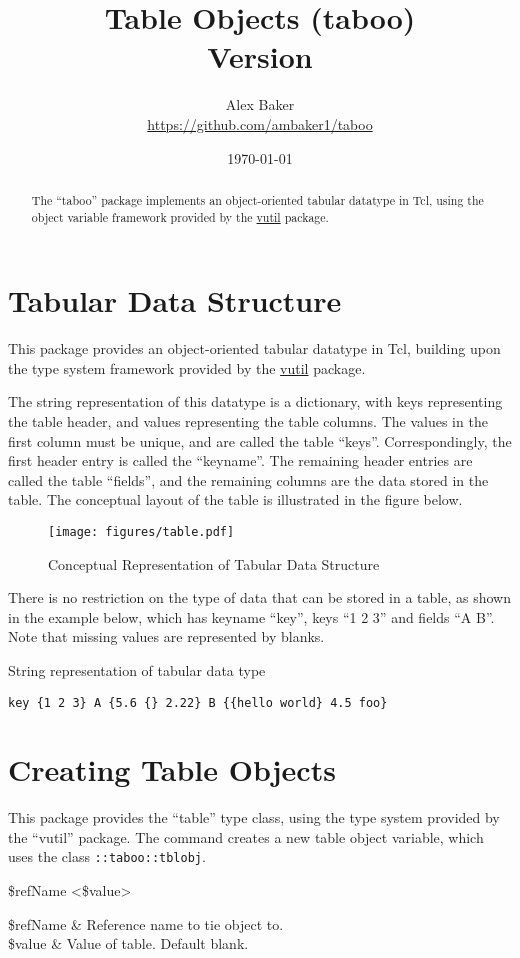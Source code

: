 \documentclass{article}
\title{\Huge{Table Objects (taboo)}\\\large Version \version}
\author{Alex Baker\\\small\url{https://github.com/ambaker1/taboo}}
\date{\small\today}
\begin{document}
\maketitle
\begin{abstract}
\begin{center}
The ``taboo'' package implements an object-oriented tabular datatype in Tcl, using the object variable framework provided by the \textcolor{blue}{\href{https://github.com/ambaker1/vutil}{vutil}} package.
\end{center}
\end{abstract}
\clearpage


\section{Tabular Data Structure}
This package provides an object-oriented tabular datatype in Tcl, building upon the type system framework provided by the \textcolor{blue}{\href{https://github.com/ambaker1/vutil}{vutil}} package.

The string representation of this datatype is a dictionary, with keys representing the table header, and values representing the table columns.
The values in the first column must be unique, and are called the table ``keys''. 
Correspondingly, the first header entry is called the ``keyname''. 
The remaining header entries are called the table ``fields'', and the remaining columns are the data stored in the table.
The conceptual layout of the table is illustrated in the figure below.
\vspace{\baselineskip}
\FloatBarrier
\begin{figure}[!htb]
    \centering
    \texttt{[image: figures/table.pdf]}
    \caption{Conceptual Representation of Tabular Data Structure}
    \label{fig:table_props}
\end{figure}
There is no restriction on the type of data that can be stored in a table, as shown in the example below, which has keyname ``key'', keys ``1 2 3'' and fields ``A B''.
Note that missing values are represented by blanks. 
\begin{example}{String representation of tabular data type}
\begin{lstlisting}
key {1 2 3} A {5.6 {} 2.22} B {{hello world} 4.5 foo}
\end{lstlisting}
\end{example}

\clearpage
\section{Creating Table Objects}
This package provides the ``table'' type class, using the type system provided by the ``vutil'' package. 
The command  creates a new table object variable, which uses the class \texttt{::taboo::tblobj}.
\begin{syntax}
 \$refName <\$value>
\end{syntax}
\begin{args}
\$refName & Reference name to tie object to. \\
\$value & Value of table. Default blank.
\end{args}
\end{document}
